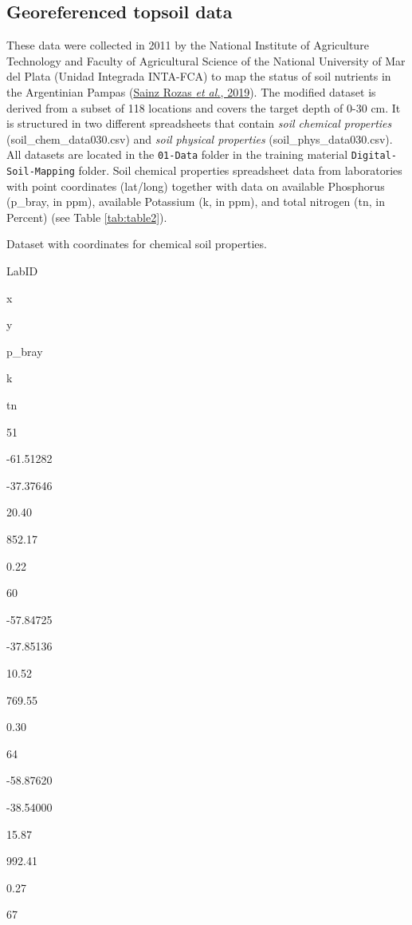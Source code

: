 \documentclass[
  10pt,
  b5paper,
  oneside]{book}
\begin{document}
\hypertarget{georeferenced-topsoil-data}{%
\subsection{Georeferenced topsoil data}\label{georeferenced-topsoil-data}}

These data were collected in 2011 by the National Institute of Agriculture Technology and Faculty of Agricultural Science of the National University of Mar del Plata (Unidad Integrada INTA-FCA) to map the status of soil nutrients in the Argentinian Pampas (\protect\hyperlink{ref-sainz2019}{Sainz Rozas \emph{et al.}, 2019}). The modified dataset is derived from a subset of 118 locations and covers the target depth of 0-30 cm. It is structured in two different spreadsheets that contain \emph{soil chemical properties} (soil\_chem\_data030.csv) and \emph{soil physical properties} (soil\_phys\_data030.csv). All datasets are located in the \texttt{01-Data} folder in the training material \texttt{Digital-Soil-Mapping} folder.
Soil chemical properties spreadsheet data from laboratories with point coordinates (lat/long) together with data on available Phosphorus (p\_bray, in ppm), available Potassium (k, in ppm), and total nitrogen (tn, in Percent) (see Table \ref{tab:table2}).

\label{tab:table2}Dataset with coordinates for chemical soil properties.

LabID

x

y

p\_bray

k

tn

51

-61.51282

-37.37646

20.40

852.17

0.22

60

-57.84725

-37.85136

10.52

769.55

0.30

64

-58.87620

-38.54000

15.87

992.41

0.27

67
\end{document}
